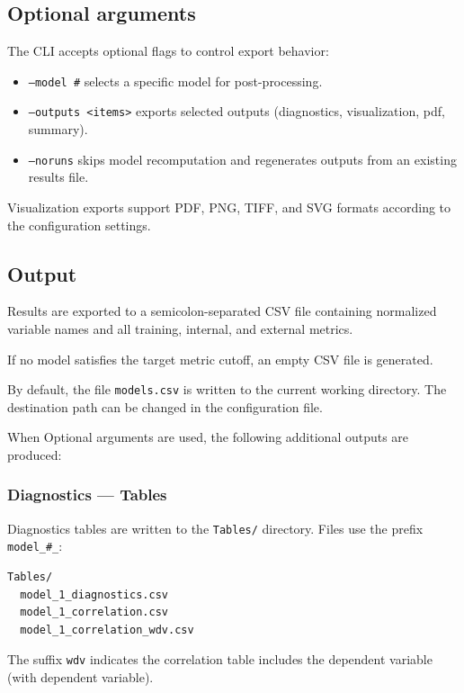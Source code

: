 \documentclass[11pt,a4paper]{article}
\begin{document}
\subsection{Optional arguments}

The CLI accepts optional flags to control export behavior:

\begin{itemize}
\item \texttt{--model \#} selects a specific model for post-processing.
\item \texttt{--outputs <items>} exports selected outputs (diagnostics, visualization, pdf, summary).
\item \texttt{--noruns} skips model recomputation and regenerates outputs from an existing results file.
\end{itemize}

Visualization exports support PDF, PNG, TIFF, and SVG formats according to the configuration settings.

\subsection{Output}

Results are exported to a semicolon-separated CSV file containing normalized variable names and all training, internal, and external metrics.

If no model satisfies the target metric cutoff, an empty CSV file is generated.

By default, the file \texttt{models.csv} is written to the current working directory.  
The destination path can be changed in the configuration file.

When Optional arguments are used, the following additional outputs are produced:

\subsubsection{Diagnostics --- Tables}

Diagnostics tables are written to the \texttt{Tables/} directory.  
Files use the prefix \texttt{model\_\#\_}:

\begin{lstlisting}[style=mlrx]
Tables/
  model_1_diagnostics.csv
  model_1_correlation.csv
  model_1_correlation_wdv.csv
\end{lstlisting}
The suffix \texttt{wdv} indicates the correlation table includes the dependent variable (with dependent variable).
\end{document}
